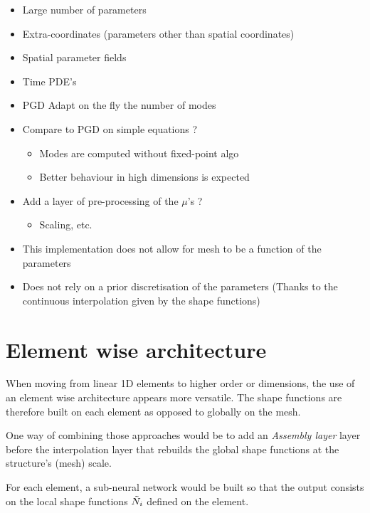 \documentclass{article}
\begin{document}
\begin{itemize}
    \item Large number of parameters
    \item Extra-coordinates (parameters other than spatial coordinates)
    \item Spatial parameter fields
    \item Time PDE's 
    \item PGD \faChevronRight Adapt on the fly the number of modes
    \item Compare to PGD on simple equations ?
    \begin{itemize}
        \item Modes are computed without fixed-point algo
        \item Better behaviour in high dimensions is expected
    \end{itemize}
    \item Add a layer of pre-processing of the $\mu$'s ?
    \begin{itemize}
        \item Scaling, etc.
    \end{itemize}
    \item[\textcolor{RougeLMS}{\faLock}] This implementation does not allow for mesh to be a function of the parameters
    \item[\textcolor{LGreenLMS}{\faCheckCircle }] Does not rely on a prior discretisation of the parameters (Thanks to the continuous interpolation given by the shape functions)
\end{itemize}



\section{Element wise architecture}

When moving from linear 1D elements to higher order or dimensions, the use of an element wise architecture appears more versatile. The shape functions are therefore built on each element as opposed to globally on the mesh. 

One way of combining those approaches would be to add an \emph{Assembly layer} layer before the interpolation layer that rebuilds the global shape functions at the structure's (mesh) scale.

For each element, a sub-neural network would be built so that the output consists on the local shape functions $\Tilde{N}_i$ defined on the element. 
\end{document}
